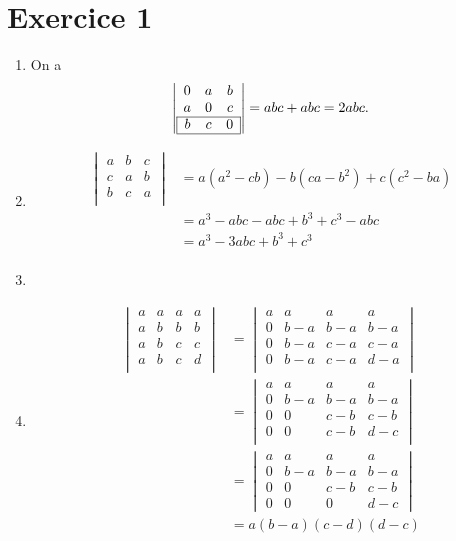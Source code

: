 \part{Exercice 1}

\begin{enumerate}
	\item On a \[
			\left|
			\begin{array}{c c c}
				0&a&b\\
				a&0&c\\ \cline{1-3}
				\multicolumn{1}{|c}{b}&c&\multicolumn{1}{c|}{0}\\\cline{1-3}
			\end{array}
			\right| = abc + abc = 2abc.
		\] 
	\item
		\begin{align*}
			\begin{vmatrix}
				a&b&c\\
				c&a&b\\
				b&c&a\\
			\end{vmatrix} &= a(a^2 - cb) - b(ca - b^2) + c(c^2 - ba)\\
			&= a^3 - abc - abc + b^3 + c^3 - abc \\
			&= a^3 -3abc + b^3 + c^3 \\
		\end{align*}
	\item{\Large {}}
	\item
		\begin{align*}
			\begin{vmatrix}
				a&a&a&a\\
				a&b&b&b\\
				a&b&c&c\\
				a&b&c&d\\
			\end{vmatrix} &=
			\begin{vmatrix}
				a&a&a&a\\
				0&b-a&b-a&b-a\\
				0&b-a&c-a&c-a\\
				0&b-a&c-a&d-a\\
			\end{vmatrix}\\
			&= 
			\begin{vmatrix}
				a&a&a&a\\
				0&b-a&b-a&b-a\\
				0&0&c-b&c-b\\
				0&0&c-b&d-c\\
			\end{vmatrix}\\
			&= 
			\begin{vmatrix}
				a&a&a&a\\
				0&b-a&b-a&b-a\\
				0&0&c-b&c-b\\
				0&0&0&d-c
			\end{vmatrix}\\
			&= a(b-a)(c-d)(d-c) \\
		\end{align*}
\end{enumerate}

